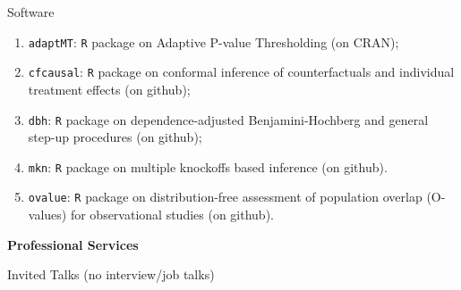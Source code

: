 \documentclass{article}
\begin{document}
\begin{large}
\noindent Software
\end{large}

\begin{enumerate}
\item \texttt{adaptMT}: \texttt{R} package on Adaptive P-value Thresholding (on CRAN);
\item \texttt{cfcausal}: \texttt{R} package on conformal inference of counterfactuals and individual treatment effects (on github);
\item \texttt{dbh}: \texttt{R} package on dependence-adjusted Benjamini-Hochberg and general step-up procedures (on github);
\item \texttt{mkn}: \texttt{R} package on multiple knockoffs based inference (on github).
\item \texttt{ovalue}: \texttt{R} package on distribution-free assessment of population overlap (O-values) for observational studies (on github).
\end{enumerate}

\vspace{5mm}
\begin{large}
\noindent \textbf{Professional Services}
\end{large}
\vspace{5mm}


\begin{large}
\noindent Invited Talks (no interview/job talks)
\end{large}
\end{document}
